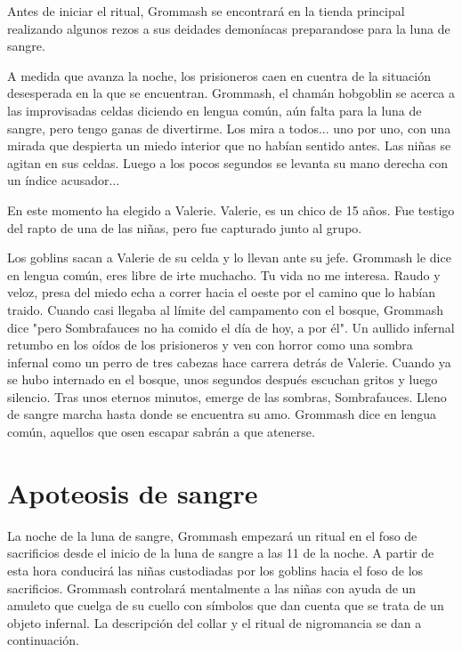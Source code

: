 \documentclass[10pt,twoside,twocolumn,openany]{dndbook}
\begin{document}
Antes de iniciar el ritual, Grommash se encontrará en la tienda principal realizando algunos
rezos a sus deidades demoníacas preparandose para la luna de sangre.

\begin{DndReadAloud}
  A medida que avanza la noche, los prisioneros caen en cuentra de la situación desesperada en la 
  que se encuentran. Grommash, el chamán hobgoblin se acerca a las improvisadas celdas diciendo 
  en lengua común, aún falta para la luna de sangre, pero tengo ganas de divertirme. Los mira a 
  todos... uno por uno, con una mirada que despierta un miedo interior que no habían sentido 
  antes. Las niñas se agitan en sus celdas. Luego a los pocos segundos se levanta su mano derecha 
  con un índice acusador...
\end{DndReadAloud}

En este momento ha elegido a Valerie. Valerie, es un chico de 15 años. Fue testigo del rapto de una de las 
niñas, pero fue capturado junto al grupo.

\begin{DndReadAloud}
Los goblins sacan a Valerie de su celda y lo llevan ante su jefe. Grommash le dice en lengua común, 
eres libre de irte muchacho. Tu vida no me interesa. Raudo y veloz, presa del miedo echa a correr 
hacia el oeste por el camino que lo habían traido. Cuando casi llegaba al límite del campamento 
con el bosque, Grommash dice "pero Sombrafauces no ha comido el día de hoy, a por él". Un aullido 
infernal retumbo en los oídos de los prisioneros y ven con horror como una sombra infernal como un 
perro de tres cabezas hace carrera detrás de Valerie. Cuando ya se hubo internado en el bosque, unos 
segundos después escuchan gritos y luego silencio. Tras unos eternos minutos, emerge de las 
sombras, Sombrafauces. Lleno de sangre marcha hasta donde se encuentra su amo. Grommash dice en 
lengua común, aquellos que osen escapar sabrán a que atenerse.
\end{DndReadAloud}

\section{Apoteosis de sangre}
La noche de la luna de sangre, Grommash empezará un ritual en el foso de sacrificios desde el 
inicio de la luna de sangre a las 11 de la noche. A partir de esta hora conducirá las niñas 
custodiadas por los goblins hacia el foso de los sacrificios. Grommash controlará mentalmente a 
las niñas con ayuda de un amuleto que cuelga de su cuello con símbolos que dan cuenta que se 
trata de un objeto infernal. La descripción del collar y el ritual de nigromancia se dan a 
continuación.
\end{document}
